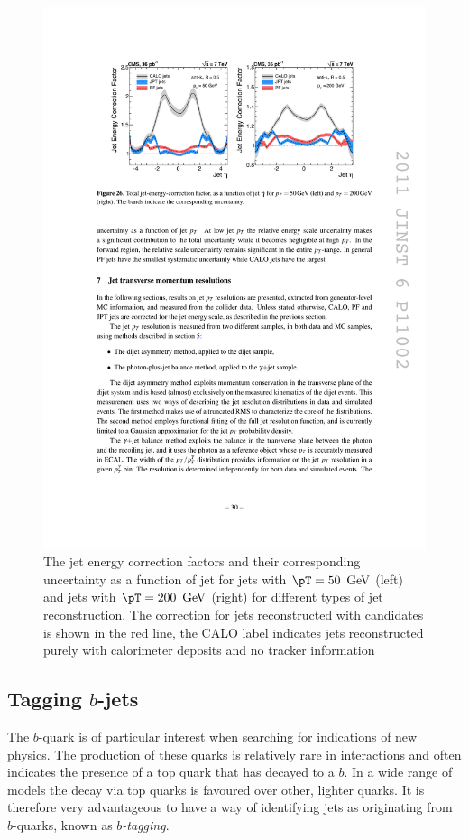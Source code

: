 \begin{figure}
\begin{center}
\includegraphics[width=0.9\linewidth]{figs/reconstruction/jec} \end{center}
\caption{The jet energy correction factors and their corresponding
uncertainty as a function of jet \eta
for jets with $\pT=50~\gev$ (left) and jets with $\pT=200~\gev$
(right) for different types of jet reconstruction. The correction for jets
reconstructed with \PF candidates is shown in the red line, the CALO
label indicates jets reconstructed purely with calorimeter deposits
and no tracker information \cite{1748-0221-6-11-P11002}}
\label{fig:jec} \end{figure}

\subsection{Tagging $b$-jets}
\label{sec:reco_btag}

The $b$-quark is of particular interest when searching for
indications of new physics. The production of these
quarks is relatively rare in \SM interactions and often
indicates the presence of a top quark that has decayed to a
$b$. In a wide range of \SUSY models the decay via top quarks is
favoured over other, lighter quarks. It is therefore very advantageous
to have a way of identifying jets as originating from $b$-quarks,
known as \emph{$b$-tagging}.

